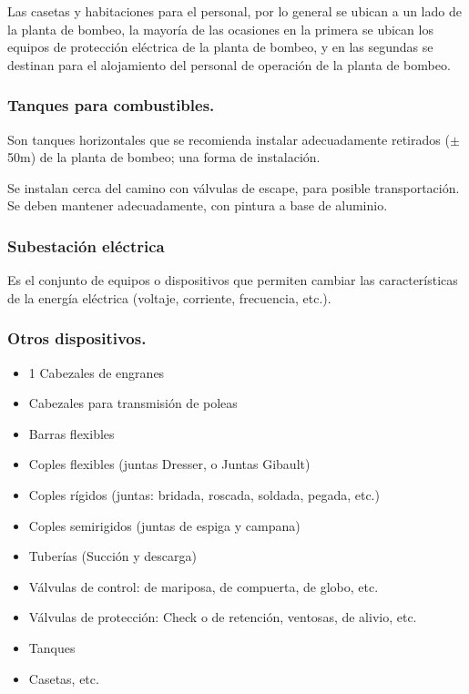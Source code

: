Las casetas y habitaciones para el personal, por lo general se ubican a un lado
de la planta de bombeo, la mayoría de las ocasiones en la primera se ubican los equipos
de protección eléctrica de la planta de bombeo, y en las segundas se destinan para el
alojamiento del personal de operación de la planta de bombeo.

\subsubsection{Tanques para combustibles.}
Son tanques horizontales que se recomienda instalar adecuadamente retirados ($\pm$ 50m) de la planta de bombeo;
una forma de instalación.

Se instalan cerca del camino con válvulas de escape, para posible
transportación. Se deben mantener adecuadamente, con pintura a base de aluminio.

\subsubsection{Subestación eléctrica}
Es el conjunto de equipos o dispositivos que permiten cambiar las características
de la energía eléctrica (voltaje, corriente, frecuencia, etc.).

\begin{center}
\end{center}


\subsubsection{Otros dispositivos.}
\begin{itemize}
	\item 1 Cabezales de engranes
	\item Cabezales para transmisión de poleas
	\item Barras flexibles
	\item Coples flexibles (juntas Dresser, o Juntas Gibault)
	\item Coples rígidos (juntas: bridada, roscada, soldada, pegada, etc.)
	\item Coples semirigidos (juntas de espiga y campana)
	\item Tuberías (Succión y descarga)
	\item Válvulas de control: de mariposa, de compuerta, de globo, etc.
	\item Válvulas de protección: Check o de retención, ventosas, de alivio, etc.
	\item Tanques
	\item Casetas, etc.
\end{itemize}

